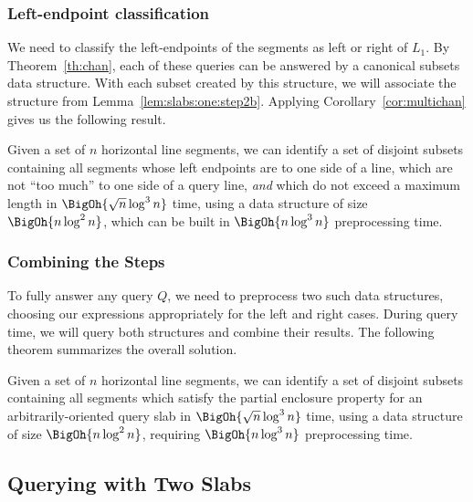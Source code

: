 \subsubsection{Left-endpoint classification}

We need to classify the left-endpoints of the segments as left or right of $L_1$. 
By Theorem~\ref{th:chan}, each of these queries can be answered by a canonical subsets data structure.
With each subset created by this structure, we will associate the structure from Lemma~\ref{lem:slabs:one:step2b}. 
Applying Corollary~\ref{cor:multichan} gives us the following result.

\begin{lemma}
\label{lem:slabs:one:step3}
Given a set of $n$ horizontal line segments, we can identify a set of disjoint subsets containing all segments whose left endpoints are to one side of a line, which are not ``too much'' to one side of a query line, \emph{and} which do not exceed a maximum length in $\BigOh{\sqrt{n}\log^3{n}}$ time, using a data structure of size $\BigOh{n\log^2{n}}$, which can be built in $\BigOh{n\log^3{n}}$ preprocessing time.
\end{lemma}


\subsubsection{Combining the Steps}

To fully answer any query $Q$, we need to preprocess two such data structures, choosing our expressions appropriately for the left and right cases.
During query time, we will query both structures and combine their results.
The following theorem summarizes the overall solution.

\begin{theorem}
\label{th:slabs:one}
Given a set of $n$ horizontal line segments, we can identify a set of disjoint subsets containing all segments which satisfy the partial enclosure property for an arbitrarily-oriented query slab in $\BigOh{\sqrt{n}\log^3{n}}$ time, using a data structure of size $\BigOh{n\log^2{n}}$, requiring $\BigOh{n\log^3{n}}$ preprocessing time.
\end{theorem}


\subsection{Querying with Two Slabs}
\label{:slabs:two}

